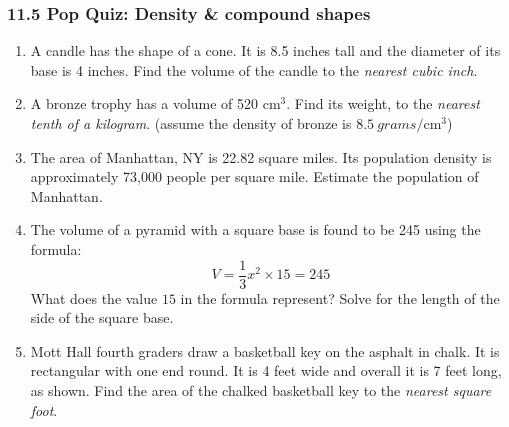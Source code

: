 \documentclass[12pt, twoside]{article}
\begin{document}
\subsubsection*{11.5 Pop Quiz: Density \& compound shapes}
 \begin{enumerate}

\item A candle has the shape of a cone. It is 8.5 inches tall and the diameter of its base is 4 inches. Find the volume of the candle to the \emph{nearest cubic inch}. \vspace{3cm}

\item A bronze trophy has a volume of 520 cm$^3$. Find its weight, to the \emph{nearest tenth of a kilogram}. (assume the density of bronze is $8.5 \ grams/ \mathrm{cm}^3$) \vspace{2.5cm}

\item The area of Manhattan, NY is 22.82 square miles. Its population density is approximately 73,000 people per square mile. Estimate the population of Manhattan. \vspace{2.5cm}

\item The volume of a pyramid with a square base is found to be 245 using the formula:
  \[V=\frac{1}{3} x^2 \times 15=245\]
  What does the value $15$ in the formula represent? Solve for the length of the side of the square base. \vspace{7cm}

\newpage
\item Mott Hall fourth graders draw a basketball key on the asphalt in chalk. It is rectangular with one end round. It is 4 feet wide and overall it is 7 feet long, as shown. Find the area of the chalked basketball key to the \emph{nearest square foot}.\\[1.5cm]


\end{enumerate}
\end{document}
